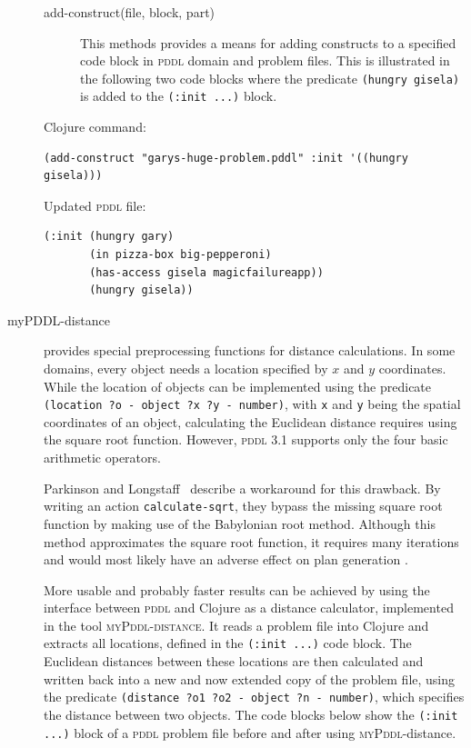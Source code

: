 \documentclass[runningheads]{llncs}
\newcommand{\mypddl}{\textsc{myPddl}\xspace}
\newcommand{\mypddldistance}{\textsc{myPddl-distance}\xspace}
\newcommand{\pddl}{\textsc{pddl}\xspace}
\begin{document}
\begin{description}
\begin{description}
\item[{add-construct(file, block, part)}] This methods provides a
  means for adding constructs to a specified code block in \pddl
  domain and problem files. This is illustrated in the following two
  code blocks where the predicate \texttt{(hungry gisela)} is added to
  the \texttt{(:init~...)} block.
\end{description}
Clojure command:
\begin{verbatim}
(add-construct "garys-huge-problem.pddl" :init '((hungry gisela)))
\end{verbatim}
Updated \pddl file:
\begin{verbatim}
(:init (hungry gary)
       (in pizza-box big-pepperoni)
       (has-access gisela magicfailureapp))
       (hungry gisela))
\end{verbatim}


\item[myPDDL-distance] provides special preprocessing functions for
  distance calculations. In some domains, every object needs a
  location specified by $x$ and $y$ coordinates.  While the location
  of objects can be implemented using the predicate \texttt{(location
    ?o - object ?x ?y - number)}, with \texttt{x} and \texttt{y} being
  the spatial coordinates of an object, calculating the Euclidean
  distance requires using the square root function. However, \pddl 3.1
  supports only the four basic arithmetic operators.

  Parkinson and Longstaff~\cite{parkinson2012increasing} describe a
  workaround for this drawback. By writing an action
  \texttt{calculate-sqrt}, they bypass the missing square root
  function by making use of the Babylonian root method. Although this
  method approximates the square root function, it requires many
  iterations and would most likely have an adverse effect on plan
  generation \cite{parkinson2012increasing}.

  More usable and probably faster results can be achieved by using the
  interface between \pddl and Clojure as a distance calculator,
  implemented in the tool \mypddldistance. It reads a problem file
  into Clojure and extracts all locations, defined in the
  \texttt{(:init ...)} code block. The Euclidean distances between
  these locations are then calculated and written back into a new and
  now extended copy of the problem file, using the predicate
  \texttt{(distance~?o1~?o2~-~object ?n~-~number)}, which specifies
  the distance between two objects. The code blocks below show the
  \texttt{(:init ...)} block of a \pddl problem file before and after using
  \mypddl-distance.


\end{description}
\end{document}
